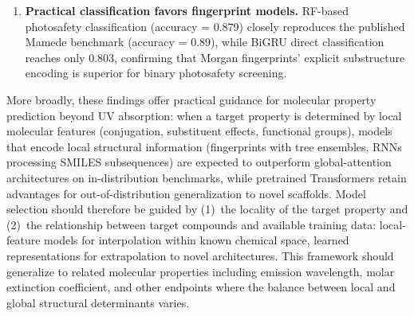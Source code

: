 \documentclass[journal=jcisd8,manuscript=article]{achemso}
\begin{document}
\begin{enumerate}
    \item \textbf{Practical classification favors fingerprint models.}
    RF-based photosafety classification (accuracy = 0.879) closely reproduces the published Mamede benchmark (accuracy = 0.89), while BiGRU direct classification reaches only 0.803, confirming that Morgan fingerprints' explicit substructure encoding is superior for binary photosafety screening.
\end{enumerate}

More broadly, these findings offer practical guidance for molecular property prediction beyond UV absorption: when a target property is determined by local molecular features (conjugation, substituent effects, functional groups), models that encode local structural information (fingerprints with tree ensembles, RNNs processing SMILES subsequences) are expected to outperform global-attention architectures on in-distribution benchmarks, while pretrained Transformers retain advantages for out-of-distribution generalization to novel scaffolds.
Model selection should therefore be guided by (1)~the locality of the target property and (2)~the relationship between target compounds and available training data: local-feature models for interpolation within known chemical space, learned representations for extrapolation to novel architectures.
This framework should generalize to related molecular properties including emission wavelength, molar extinction coefficient, and other endpoints where the balance between local and global structural determinants varies.
\end{document}

